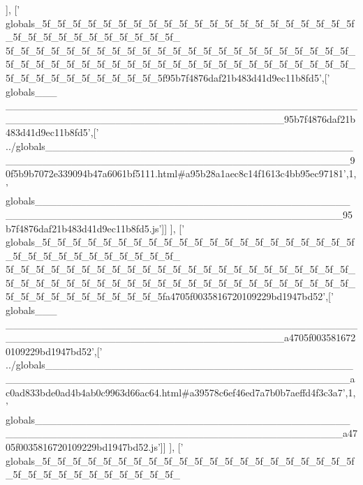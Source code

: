 \begin{DoxyCode}
      ],
  [\textcolor{stringliteral}{'
      globals\_5f\_5f\_5f\_5f\_5f\_5f\_5f\_5f\_5f\_5f\_5f\_5f\_5f\_5f\_5f\_5f\_5f\_5f\_5f\_5f\_5f\_5f\_5f\_5f\_5f\_5f\_5f\_5f\_5f\_5f\_5f\_5f\_
      5f\_5f\_5f\_5f\_5f\_5f\_5f\_5f\_5f\_5f\_5f\_5f\_5f\_5f\_5f\_5f\_5f\_5f\_5f\_5f\_5f\_5f\_5f\_5f\_5f\_5f\_5f\_5f\_5f\_5f\_5f\_5f\_5f\_5f\_5f\_5f\_5f\_5f\_5f\_5f\_5f\_5f\_5f\_5f\_5f\_5f\_5f\_5f\_5f\_5f\_5f\_5f\_5f\_5f\_5f\_5f\_5f95b7f4876daf21b483d41d9ec11b8fd5'},[\textcolor{stringliteral}{'
      globals\_\_\_
      \_\_\_\_\_\_\_\_\_\_\_\_\_\_\_\_\_\_\_\_\_\_\_\_\_\_\_\_\_\_\_\_\_\_\_\_\_\_\_\_\_\_\_\_\_\_\_\_\_\_\_\_\_\_\_\_\_\_\_\_\_\_\_\_\_\_\_\_\_\_\_\_\_\_\_\_\_\_\_\_\_\_\_\_\_\_95b7f4876daf21b483d41d9ec11b8fd5'},[\textcolor{stringliteral}{'
      ../globals\_\_\_\_\_\_\_\_\_\_\_\_\_\_\_\_\_\_\_\_\_\_\_\_\_\_\_\_\_\_\_\_\_\_\_\_\_\_\_\_\_\_\_\_\_\_\_\_\_\_\_\_\_\_\_\_\_\_\_\_\_\_\_\_\_\_\_\_\_\_\_\_\_\_\_\_\_\_\_\_\_\_\_\_\_\_\_\_\_90f5b9b7072e339094b47a6061bf5111.html#a95b28a1aec8c14f1613c4bb95ec97181'},1,\textcolor{stringliteral}{'
      globals\_\_\_\_\_\_\_\_\_\_\_\_\_\_\_\_\_\_\_\_\_\_\_\_\_\_\_\_\_\_\_\_\_\_\_\_\_\_\_\_\_\_\_\_\_\_\_\_\_\_\_\_\_\_\_\_\_\_\_\_\_\_\_\_\_\_\_\_\_\_\_\_\_\_\_\_\_\_\_\_\_\_\_\_\_\_\_\_\_95b7f4876daf21b483d41d9ec11b8fd5.js'}]]
      ],
  [\textcolor{stringliteral}{'
      globals\_5f\_5f\_5f\_5f\_5f\_5f\_5f\_5f\_5f\_5f\_5f\_5f\_5f\_5f\_5f\_5f\_5f\_5f\_5f\_5f\_5f\_5f\_5f\_5f\_5f\_5f\_5f\_5f\_5f\_5f\_5f\_5f\_
      5f\_5f\_5f\_5f\_5f\_5f\_5f\_5f\_5f\_5f\_5f\_5f\_5f\_5f\_5f\_5f\_5f\_5f\_5f\_5f\_5f\_5f\_5f\_5f\_5f\_5f\_5f\_5f\_5f\_5f\_5f\_5f\_5f\_5f\_5f\_5f\_5f\_5f\_5f\_5f\_5f\_5f\_5f\_5f\_5f\_5f\_5f\_5f\_5f\_5f\_5f\_5f\_5f\_5f\_5f\_5f\_5fa4705f0035816720109229bd1947bd52'},[\textcolor{stringliteral}{'
      globals\_\_\_
      \_\_\_\_\_\_\_\_\_\_\_\_\_\_\_\_\_\_\_\_\_\_\_\_\_\_\_\_\_\_\_\_\_\_\_\_\_\_\_\_\_\_\_\_\_\_\_\_\_\_\_\_\_\_\_\_\_\_\_\_\_\_\_\_\_\_\_\_\_\_\_\_\_\_\_\_\_\_\_\_\_\_\_\_\_\_a4705f0035816720109229bd1947bd52'},[\textcolor{stringliteral}{'
      ../globals\_\_\_\_\_\_\_\_\_\_\_\_\_\_\_\_\_\_\_\_\_\_\_\_\_\_\_\_\_\_\_\_\_\_\_\_\_\_\_\_\_\_\_\_\_\_\_\_\_\_\_\_\_\_\_\_\_\_\_\_\_\_\_\_\_\_\_\_\_\_\_\_\_\_\_\_\_\_\_\_\_\_\_\_\_\_\_\_\_ac0ad833bde0ad4b4ab0c9963d66ac64.html#a39578c6ef46ed7a7b0b7aeffd4f3c3a7'},1,\textcolor{stringliteral}{'
      globals\_\_\_\_\_\_\_\_\_\_\_\_\_\_\_\_\_\_\_\_\_\_\_\_\_\_\_\_\_\_\_\_\_\_\_\_\_\_\_\_\_\_\_\_\_\_\_\_\_\_\_\_\_\_\_\_\_\_\_\_\_\_\_\_\_\_\_\_\_\_\_\_\_\_\_\_\_\_\_\_\_\_\_\_\_\_\_\_\_a4705f0035816720109229bd1947bd52.js'}]]
      ],
  [\textcolor{stringliteral}{'
      globals\_5f\_5f\_5f\_5f\_5f\_5f\_5f\_5f\_5f\_5f\_5f\_5f\_5f\_5f\_5f\_5f\_5f\_5f\_5f\_5f\_5f\_5f\_5f\_5f\_5f\_5f\_5f\_5f\_5f\_5f\_5f\_5f\_
}
\end{DoxyCode}
